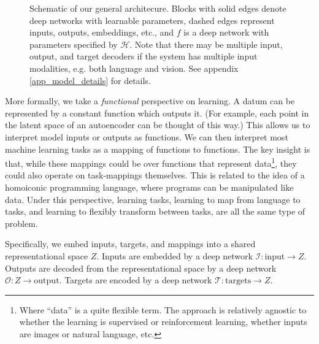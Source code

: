 \documentclass{article}
\begin{document}
\begin{figure}
\caption{Schematic of our general architecure. Blocks with solid edges denote deep networks with learnable parameters, dashed edges represent inputs, outputs, embeddings, etc., and $f$ is a deep network with parameters specified by $\mathcal{H}$. Note that there may be multiple input, output, and target decoders if the system has multiple input modalities, e.g. both language and vision. See appendix \ref{app_model_details} for details.} \label{architecture_fig}
\end{figure}
More formally, we take a \emph{functional} perspective on learning. A datum can be represented by a constant function which outputs it. (For example, each point in the latent space of an autoencoder can be thought of this way.) This allows us to interpret model inputs or outputs as functions. We can then interpret most machine learning tasks as a mapping of functions to functions. The key insight is that, while these mappings could be over functions that represent data\footnote{Where ``data'' is a quite flexible term. The approach is relatively agnostic to whether the learning is supervised or reinforcement learning, whether inputs are images or natural language, etc.}, they could also operate on task-mappings themselves. This is related to the idea of a homoiconic programming language, where programs can be manipulated like data. Under this perspective, learning tasks, learning to map from language to tasks, and learning to flexibly transform between tasks, are all the same type of problem. \par
Specifically, we embed inputs, targets, and mappings into a shared representational space $Z$. Inputs are embedded by a deep network $\mathcal{I}: \text{input} \rightarrow Z$. Outputs are decoded from the representational space by a deep network $\mathcal{O}: Z \rightarrow \text{output}$. Targets are encoded by a deep network $\mathcal{T}: \text{targets} \rightarrow Z$. \par
\end{document}
